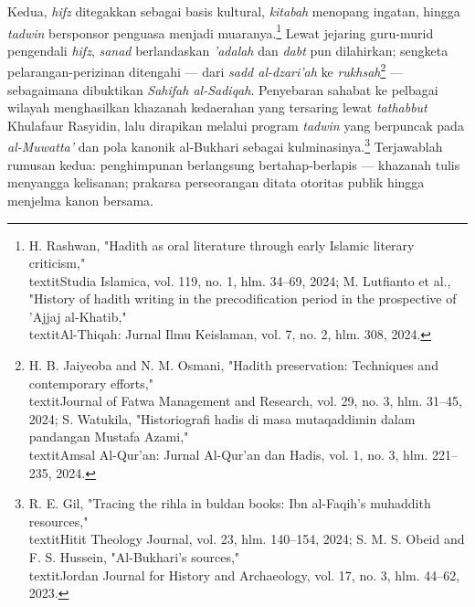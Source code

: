 Kedua, \textit{hifz} ditegakkan sebagai basis kultural, \textit{kitabah} menopang ingatan, hingga \textit{tadwin} bersponsor penguasa menjadi muaranya.\footnote{H. Rashwan, "Hadith as oral literature through early Islamic literary criticism," \\textit{Studia Islamica}, vol. 119, no. 1, hlm. 34--69, 2024; M. Lutfianto et al., "History of hadith writing in the precodification period in the prospective of 'Ajjaj al-Khatib," \\textit{Al-Thiqah: Jurnal Ilmu Keislaman}, vol. 7, no. 2, hlm. 308, 2024.} Lewat jejaring guru-murid pengendali \textit{hifz}, \textit{sanad} berlandaskan \textit{'adalah} dan \textit{dabt} pun dilahirkan; sengketa pelarangan-perizinan ditengahi --- dari \textit{sadd al-dzari'ah} ke \textit{rukhsah}\footnote{H. B. Jaiyeoba and N. M. Osmani, "Hadith preservation: Techniques and contemporary efforts," \\textit{Journal of Fatwa Management and Research}, vol. 29, no. 3, hlm. 31--45, 2024; S. Watukila, "Historiografi hadis di masa mutaqaddimin dalam pandangan Mustafa Azami," \\textit{Amsal Al-Qur'an: Jurnal Al-Qur'an dan Hadis}, vol. 1, no. 3, hlm. 221--235, 2024.} --- sebagaimana dibuktikan \textit{Sahifah al-Sadiqah}. Penyebaran sahabat ke pelbagai wilayah menghasilkan khazanah kedaerahan yang tersaring lewat \textit{tathabbut} Khulafaur Rasyidin, lalu dirapikan melalui program \textit{tadwin} yang berpuncak pada \textit{al-Muwatta'} dan pola kanonik al-Bukhari sebagai kulminasinya.\footnote{R. E. Gil, "Tracing the rihla in buldan books: Ibn al-Faqih's muhaddith resources," \\textit{Hitit Theology Journal}, vol. 23, hlm. 140--154, 2024; S. M. S. Obeid and F. S. Hussein, "Al-Bukhari's sources," \\textit{Jordan Journal for History and Archaeology}, vol. 17, no. 3, hlm. 44--62, 2023.} Terjawablah rumusan kedua: penghimpunan berlangsung bertahap-berlapis --- khazanah tulis menyangga kelisanan; prakarsa perseorangan ditata otoritas publik hingga menjelma kanon bersama.

